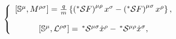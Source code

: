 \begin{equation}
\left\{ 
\begin{array}{c}
\left[ \Bbb{S}^{\mu },M^{\rho \sigma }\right] =\frac{q}{m}\left\{ \left( ^{*}%
\mathcal{S}F\right) ^{\mu \rho }x^{\sigma }-\left( ^{*}\mathcal{S}F\right)
^{\mu \sigma }x^{\rho }\right\} , \\ 
\\ 
\left[ \Bbb{S}^{\mu },\mathcal{L}^{\rho \sigma }\right] =\,^{*}\mathcal{S}%
^{\mu \sigma }\dot{x}^{\rho }-\,^{*}\mathcal{S}^{\mu \rho }\dot{x}^{\sigma },
\end{array}
\right.
\end{equation}


